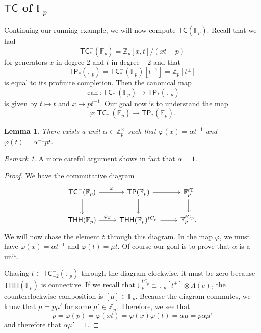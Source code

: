 \documentclass[10pt, oneside]{memoir}
\newtheorem{lem}[thm]{Lemma}
\theoremstyle{definition}
\theoremstyle{remark}
\newtheorem{rmk}[thm]{Remark}
\theoremstyle{plain}
\theoremstyle{definition}
\theoremstyle{remark}
\newcommand{\Z}{\mathbb{Z}}
\newcommand{\F}{\mathbb{F}}
\newcommand{\T}{\mathbb{T}}
\newcommand{\on}[1]{\operatorname{#1}}
\newcommand{\ms}[1]{\mathsf{#1}}
\newcommand{\1}{\mathbf{1}}
\newcommand{\2}{\mathbf{2}}
\newcommand{\3}{\mathbf{3}}
\newcommand{\THH}{\ms{THH}}
\newcommand{\TC}{\ms{TC}}
\newcommand{\TP}{\ms{TP}}
\begin{document}
\subsection{\(\TC \) of \(\F_p \)}%
\label{sub:TC of Fp}

Continuing our running example, we will now compute \(\TC(\F_p) \). Recall that we had
\[ \TC_*^-(\F_p) = \Z_p[x,t]/(xt-p) \]
for generators \(x \) in degree \(2 \) and \(t \) in degree \(-2 \) and that
\[ \TP_*(\F_p) = \TC_*^-(\F_p)[t^{-1}] = \Z_p[t^{\pm}] \]
is equal to its profinite completion. Then the canonical map
\[ \on{can} \colon \TC_*^-(\F_p) \to \TP_*(\F_p) \]
is given by \(t \mapsto t \) and \(x \mapsto pt^{-1} \). Our goal now is to understand the map
\[ \varphi \colon \TC_*^-(\F_p) \to \TP_*(\F_p). \]

\begin{lem}
    There exists a unit \(\alpha \in \Z_p^{\times} \) such that \(\varphi(x) = \alpha t^{-1} \) and \(\varphi(t) = \alpha^{-1} pt \).
\end{lem}

\begin{rmk}
    A more careful argument shows in fact that \(\alpha = 1 \).
\end{rmk}

\begin{proof}
    We have the commutative diagram
    \begin{equation*}
    \begin{tikzcd}
        \TC^-(\F_p) \ar{r}{\varphi} \ar{d} & \TP(\F_p) \ar{d} \ar{r} & \F_p^{t\T} \ar{d} \\
        \THH(\F_p) \ar{r}{\varphi_D} & \THH(\F_p)^{t C_p} \ar{r} & \F_p^{t C_p}.
    \end{tikzcd}
    \end{equation*}
    We will now chase the element \(t \) through this diagram. In the map \(\varphi \), we must have \(\varphi(x) = \alpha t^{-1} \) and \(\varphi(t) = \mu t \). Of course our goal is to prove that \(\alpha \) is a unit. 
    
    Chasing \(t \in \TC^-_{-2}(\F_p) \) through the diagram clockwise, it must be zero because \(\THH(\F_p) \) is connective. If we recall that \(\F_p^{t C_p} \cong \F_p[t^{\pm}] \otimes \Lambda(e) \), the counterclockwise composition is \([\mu] \in \F_p \). Because the diagram commutes, we know that \(\mu = p \mu' \) for some \(\mu' \in \Z_p \). Therefore, we see that
    \[ p = \varphi(p) = \varphi(xt) = \varphi(x) \varphi(t) = \alpha \mu = p \alpha \mu' \]
    and therefore that \(\alpha \mu' = 1 \).
\end{proof}
\end{document}
